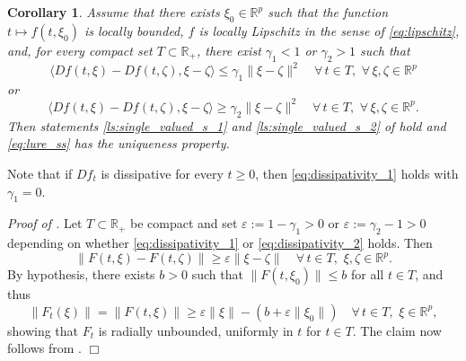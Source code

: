 \documentclass[a4paper,11pt]{article}
\newcommand{\R}{\mathbb R}
\numberwithin{equation}{section}
\numberwithin{figure}{section}
\numberwithin{table}{section}
\newtheorem{corollary}[theorem]{Corollary}
\begin{document}
%
\begin{corollary}\label{cor:dissipativity}
Assume that there exists $\xi_0\in\R^p$ such that the function
$t\mapsto f(t,\xi_0)$ is locally bounded, $f$ is locally Lipschitz in the
sense of \eqref{eq:lipschitz}, and, for every compact set $T\subset\R_+$, there
exist $\gamma_1<1$ or $\gamma_2>1$ such that
\begin{equation}\label{eq:dissipativity_1}
\langle Df(t,\xi)-Df(t,\zeta),\xi-\zeta\rangle\leq\gamma_1\|\xi-\zeta\|^2\quad
\forall\,t\in T,\,\,\forall\,\xi,\zeta\in\R^p
\end{equation}
or
\begin{equation}\label{eq:dissipativity_2}
\langle Df(t,\xi)-Df(t,\zeta),\xi-\zeta\rangle\geq\gamma_2\|\xi-\zeta\|^2\quad
\forall\,t\in T,\,\,\forall\,\xi,\zeta\in\R^p.
\end{equation}
Then statements \ref{ls:single_valued_s_1} and \ref{ls:single_valued_s_2} of  hold
and \eqref{eq:lure_ss} has the uniqueness property.
\end{corollary}
Note that if $Df_t$ is dissipative for every $t\geq 0$, then \eqref{eq:dissipativity_1} holds
with $\gamma_1=0$.

{\it Proof of .} Let $T\subset\R_+$ be compact and set $\varepsilon:=1-\gamma_1>0$ or $\varepsilon:=\gamma_2-1>0$ depending on whether \eqref{eq:dissipativity_1} or \eqref{eq:dissipativity_2} holds. Then
\[
\|F(t,\xi)-F(t,\zeta)\|\geq\varepsilon\|\xi-\zeta\|\quad\forall\,t\in T,\,\,\xi,\zeta\in\R^p.
\]
By hypothesis, there exists $b>0$ such that $\|F(t,\xi_0)\|\leq b$ for all $t\in T$, and thus
\[
\|F_t(\xi)\|=\|F(t,\xi)\|\geq\varepsilon\|\xi\|-(b+\varepsilon\|\xi_0\|)\quad\forall\,t\in T,\,\,\xi\in\R^p,
\]
showing that $F_t$ is radially unbounded, uniformly in $t$ for $t\in T$. The claim now follows
from .
\hfill$\Box$
\end{document}
